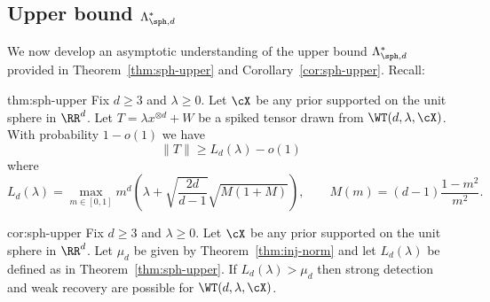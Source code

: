 \documentclass{article}
\begin{document}
\subsection{Upper bound $\Lambda^*_{\sph,d}$}

We now develop an asymptotic understanding of the upper bound $\Lambda^*_{\sph,d}$ provided in Theorem~\ref{thm:sph-upper} and Corollary~\ref{cor:sph-upper}. Recall:

\begin{reptheorem}{thm:sph-upper}
Fix $d \ge 3$ and $\lambda \ge 0$. Let $\cX$ be any prior supported on the unit sphere in $\RR^d$. Let $T = \lambda x^{\otimes d} + W$ be a spiked tensor drawn from $\WT(d,\lambda,\cX)$. With probability $1-o(1)$ we have
$$\|T\| \ge L_d(\lambda) - o(1)$$
where
\begin{equation} L_d(\lambda) = \max_{m \in [0,1]} m^d \left(\lambda + \sqrt{\frac{2d}{d-1}} \sqrt{M (1+M)}\right), \qquad M(m) = (d-1) \frac{1-m^2}{m^2}.\end{equation}
\end{reptheorem}

\begin{repcorollary}{cor:sph-upper}
Fix $d \ge 3$ and $\lambda \ge 0$. Let $\cX$ be any prior supported on the unit sphere in $\RR^d$. Let $\mu_d$ be given by Theorem~\ref{thm:inj-norm} and let $L_d(\lambda)$ be defined as in Theorem~\ref{thm:sph-upper}. If $L_d(\lambda) > \mu_d$ then strong detection and weak recovery are possible for $\WT(d,\lambda,\cX)$.
\end{repcorollary}
\end{document}
